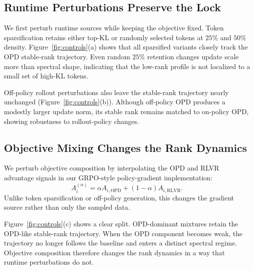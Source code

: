 \documentclass{llmxive}
\begin{document}
\subsection{Runtime Perturbations Preserve the Lock}
\label{sec:runtime-controls}

We first perturb runtime sources while keeping the objective fixed. Token
sparsification retains either top-KL or randomly selected tokens at
$25\%$ and $50\%$ density. Figure~\ref{fig:controls}(a) shows that all
sparsified variants closely track the OPD stable-rank trajectory. Even
random $25\%$ retention changes update scale more than spectral shape,
indicating that the low-rank profile is not localized to a small set of
high-KL tokens.


Off-policy rollout perturbations also leave the stable-rank trajectory
nearly unchanged (Figure~\ref{fig:controls}(b)). Although off-policy OPD
produces a modestly larger update norm, its stable rank remains matched to
on-policy OPD, showing robustness to rollout-policy changes.

\subsection{Objective Mixing Changes the Rank Dynamics}
\label{sec:objective-mixing}
We perturb objective composition by interpolating the OPD and RLVR
advantage signals in our GRPO-style policy-gradient implementation:
\begin{equation}
    A_i^{(\alpha)}
    =
    \alpha A_{i,\mathrm{OPD}}
    +
    (1-\alpha)A_{i,\mathrm{RLVR}} .
    \label{eq:objective-mixing}
\end{equation}
Unlike token sparsification or off-policy generation, this changes the
gradient source rather than only the sampled data.

Figure~\ref{fig:controls}(c) shows a clear split. OPD-dominant mixtures
retain the OPD-like stable-rank trajectory. When the OPD component becomes
weak, the trajectory no longer follows the baseline and enters a distinct
spectral regime. Objective composition therefore changes the rank dynamics
in a way that runtime perturbations do not.
\end{document}
